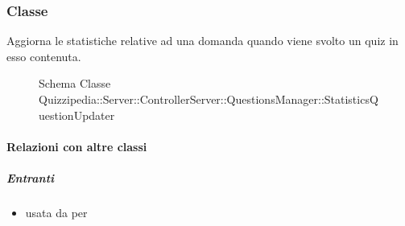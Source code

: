 \subsubsection{Classe }
Aggiorna le statistiche relative ad una domanda quando viene svolto un quiz in esso contenuta.
\begin{figure}[H]
\centering
\noindent{}
\caption[Schema Classe StatisticsQuestionUpdater]{Schema Classe Quizzipedia::Server::ControllerServer::QuestionsManager::StatisticsQuestionUpdater}
\end{figure}
\paragraph{Relazioni con altre classi}
\subparagraph{Entranti}
\begin{itemize}
\item usata da  per 
\end{itemize}
